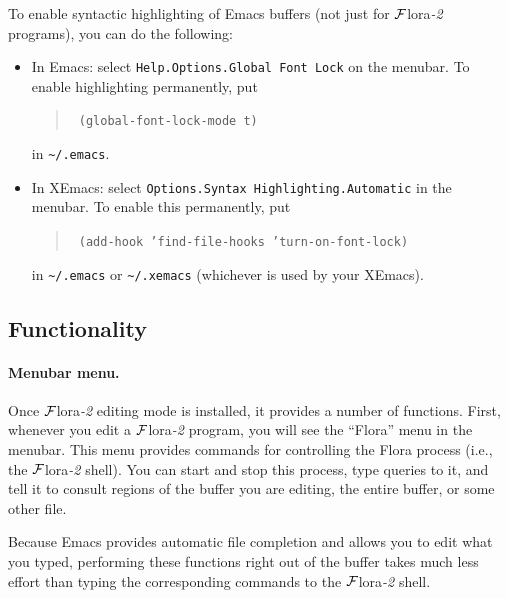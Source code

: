 \documentclass[11pt]{article}
\newcommand{\FLORA}{{\mbox{\sc ${\cal F}${lora}\rm\emph{-2}}}\xspace}
\begin{document}
To enable syntactic highlighting of Emacs buffers (not just for \FLORA
programs), you can do the following:
\begin{itemize}
  \item  {\sf In Emacs:} select {\tt Help.Options.Global Font Lock} on
    the menubar.  To enable highlighting permanently, put 
    \begin{quote}
      \tt
      (global-font-lock-mode t)
    \end{quote}
    in \verb|~/.emacs|.
  \item {\sf In XEmacs:} select {\tt Options.Syntax
        Highlighting.Automatic} in the menubar. To enable this permanently, put
      \begin{quote}
        \tt
        (add-hook 'find-file-hooks 'turn-on-font-lock)
      \end{quote}
      in \verb|~/.emacs| or \verb|~/.xemacs| (whichever is used by your
      XEmacs).
\end{itemize}


\subsection{Functionality}


\paragraph{Menubar menu.}
Once \FLORA editing mode is installed, it provides a number of functions.
First, whenever you edit a \FLORA program, you will see the ``Flora'' menu
in the menubar. This menu provides commands for controlling the Flora
process (i.e., the \FLORA shell). You can start and stop
this process, type queries to it, and tell it to consult regions of
the buffer you are editing, the entire buffer, or some other file.

Because Emacs provides automatic file completion and allows you to edit
what you typed, performing these functions right out of the buffer takes
much less effort than typing the corresponding commands to the \FLORA
shell.
\end{document}
